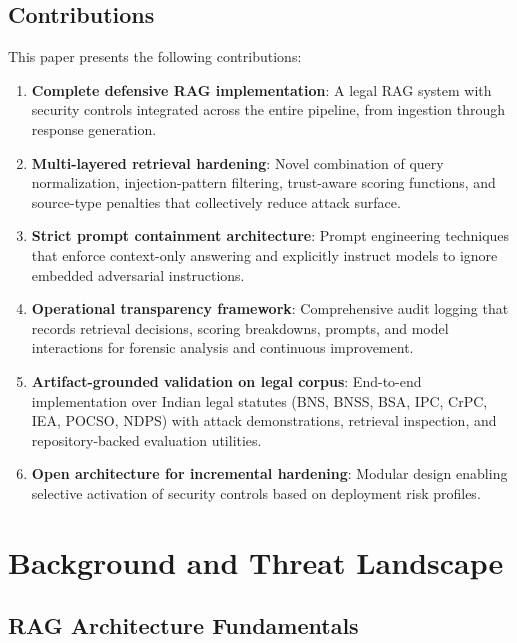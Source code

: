 \documentclass[conference]{IEEEtran}
\begin{document}
\subsection{Contributions}

This paper presents the following contributions:

\begin{enumerate}
    \item \textbf{Complete defensive RAG implementation}: A legal RAG system with security controls integrated across the entire pipeline, from ingestion through response generation.
    
    \item \textbf{Multi-layered retrieval hardening}: Novel combination of query normalization, injection-pattern filtering, trust-aware scoring functions, and source-type penalties that collectively reduce attack surface.
    
    \item \textbf{Strict prompt containment architecture}: Prompt engineering techniques that enforce context-only answering and explicitly instruct models to ignore embedded adversarial instructions.
    
    \item \textbf{Operational transparency framework}: Comprehensive audit logging that records retrieval decisions, scoring breakdowns, prompts, and model interactions for forensic analysis and continuous improvement.
    
    \item \textbf{Artifact-grounded validation on legal corpus}: End-to-end implementation over Indian legal statutes (BNS, BNSS, BSA, IPC, CrPC, IEA, POCSO, NDPS) with attack demonstrations, retrieval inspection, and repository-backed evaluation utilities.
    
    \item \textbf{Open architecture for incremental hardening}: Modular design enabling selective activation of security controls based on deployment risk profiles.
\end{enumerate}

\section{Background and Threat Landscape}

\subsection{RAG Architecture Fundamentals}
\end{document}
